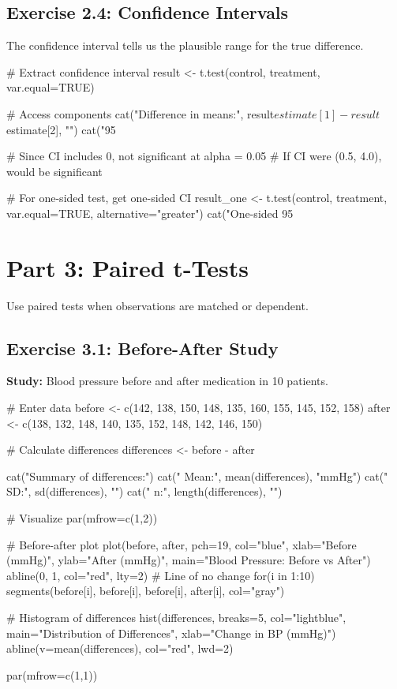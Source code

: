 \documentclass[11pt]{article}
\begin{document}
\subsection{Exercise 2.4: Confidence Intervals}

The confidence interval tells us the plausible range for the true difference.

\begin{rcode}
# Extract confidence interval
result <- t.test(control, treatment, var.equal=TRUE)

# Access components
cat("Difference in means:", result$estimate[1] - result$estimate[2], "\n")
cat("95%

# Since CI includes 0, not significant at alpha = 0.05
# If CI were (0.5, 4.0), would be significant

# For one-sided test, get one-sided CI
result_one <- t.test(control, treatment,
                     var.equal=TRUE,
                     alternative="greater")
cat("One-sided 95%
\end{rcode}

\section{Part 3: Paired t-Tests}

Use paired tests when observations are matched or dependent.

\subsection{Exercise 3.1: Before-After Study}

\textbf{Study:} Blood pressure before and after medication in 10 patients.

\begin{rcode}
# Enter data
before <- c(142, 138, 150, 148, 135, 160, 155, 145, 152, 158)
after <- c(138, 132, 148, 140, 135, 152, 148, 142, 146, 150)

# Calculate differences
differences <- before - after

cat("Summary of differences:\n")
cat("  Mean:", mean(differences), "mmHg\n")
cat("  SD:", sd(differences), "\n")
cat("  n:", length(differences), "\n")

# Visualize
par(mfrow=c(1,2))

# Before-after plot
plot(before, after, pch=19, col="blue",
     xlab="Before (mmHg)", ylab="After (mmHg)",
     main="Blood Pressure: Before vs After")
abline(0, 1, col="red", lty=2)  # Line of no change
for(i in 1:10) {
  segments(before[i], before[i], before[i], after[i], col="gray")
}

# Histogram of differences
hist(differences, breaks=5, col="lightblue",
     main="Distribution of Differences",
     xlab="Change in BP (mmHg)")
abline(v=mean(differences), col="red", lwd=2)

par(mfrow=c(1,1))
\end{rcode}
\end{document}
